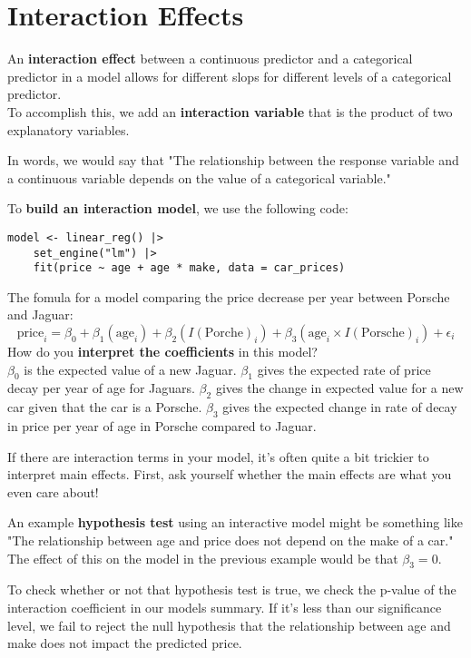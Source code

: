 \documentclass[titlepage, 12pt, leqno]{article}
\begin{document}
\pagebreak
\section{Interaction Effects}
\begin{definition}
    An \textbf{interaction effect} between a continuous predictor and a
    categorical predictor in a model allows for different slops for different
    levels of a categorical predictor.\\[.1in]
    To accomplish this, we add an \textbf{interaction variable} that is the 
    product of two explanatory variables.
\end{definition}

In words, we would say that "The relationship between the response variable and
a continuous variable depends on the value of a categorical variable."

To \textbf{build an interaction model}, we use the following code:
\begin{verbatim}
model <- linear_reg() |>
    set_engine("lm") |>
    fit(price ~ age + age * make, data = car_prices)
\end{verbatim}

\begin{ex}
    The fomula for a model comparing the price decrease per year between Porsche
    and Jaguar:
    \[
        \text{price}_i = \beta_0 + \beta_1( \text{age}_i) +
        \beta_2(I( \text{Porche})_i) + \beta_3( \text{age}_i \times I( \text{
        Porsche})_i) + \epsilon_i
    \]
    How do you \textbf{interpret the coefficients} in this model?\\[.1in]
    $\beta_0$ is the expected value of a new Jaguar. $\beta_1$ gives
    the expected rate of price decay per year of age for Jaguars.
    $\beta_2$ gives the change in expected value for a new car given that
    the car is a Porsche. $\beta_3$ gives the expected change in rate of
    decay in price per year of age in Porsche compared to Jaguar.
\end{ex}

\begin{note}
    If there are interaction terms in your model, it's often quite a bit trickier
    to interpret main effects. First, ask yourself whether the main effects are
    what you even care about!
\end{note}

An example \textbf{hypothesis test} using an interactive model might be something
like "The relationship between age and price does not depend on the make of a 
car." The effect of this on the model in the previous example would be that
$\beta_3 = 0$.

To check whether or not that hypothesis test is true, we check the p-value of the
interaction coefficient in our models summary. If it's less than our significance
level, we fail to reject the null hypothesis that the relationship between age
and make does not impact the predicted price.
\end{document}
